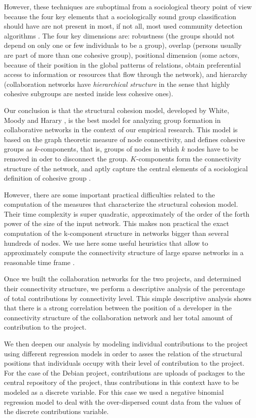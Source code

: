 However, these techniques are suboptimal from a sociological theory point of view because the four key elements that a sociologically sound group classification should have are not present in most, if not all, most used community detection algorithms \citep{torrents:2014}. The four key dimensions are: robustness (the groups should not depend on only one or few individuals to be a group), overlap (persons usually are part of more than one cohesive group), positional dimension (some actors, because of their position in the global patterns of relations, obtain preferential access to information or resources that flow through the network), and hierarchy (collaboration networks have \emph{hierarchical structure} in the sense that highly cohesive subgroups are nested inside less cohesive ones).

Our conclusion is that the structural cohesion model, developed by White, Moody and Harary \citep{white:2001, moody:2003}, is the best model for analyzing group formation in collaborative networks in the context of our empirical research. This model is based on the graph theoretic measure of node connectivity, and defines cohesive groups as $k$-components, that is, groups of nodes in which $k$ nodes have to be removed in oder to disconnect the group. $K$-components form the connectivity structure of the network, and aptly capture the central elements of a sociological definition of cohesive group \citep{torrents:2014}.

However, there are some important practical difficulties related to the computation of the measures that characterize the structural cohesion model. Their time complexity is super quadratic, approximately of the order of the forth power of the size of the input network. This makes non practical the exact computation of the k-component structure in networks bigger than several hundreds of nodes. We use here some useful heuristics that allow to approximately compute the connectivity structure of large sparse networks in a reasonable time frame \citep{torrents:2014}.

Once we built the collaboration networks for the two projects, and determined their connectivity structure, we perform a descriptive analysis of the percentage of total contributions by connectivity level. This simple descriptive analysis shows that there is a strong correlation between the position of a developer in the connectivity structure of the collaboration network and her total amount of contribution to the project.

We then deepen our analysis by modeling individual contributions to the project using different regression models in order to asses the relation of the structural positions that individuals occupy with their level of contribution to the project. For the case of the Debian project, contributions are uploads of packages to the central repository of the project, thus contributions in this context have to be modeled as a discrete variable. For this case we used a negative binomial regression model to deal with the over-dispersed count data from the values of the discrete contributions variable.


